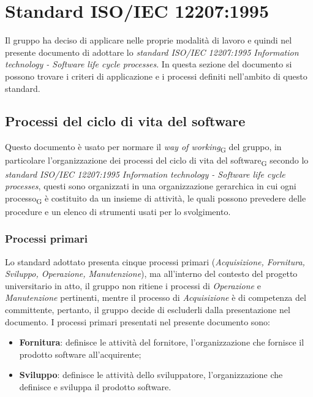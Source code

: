 \section{Standard ISO/IEC 12207:1995}
Il gruppo ha deciso di applicare nelle proprie modalità di lavoro e quindi nel presente documento di adottare lo \textit{standard ISO/IEC 12207:1995 Information technology - Software life cycle processes}. In questa sezione del documento si possono trovare i criteri di applicazione e i processi definiti nell'ambito di questo standard.
\subsection{Processi del ciclo di vita del software}
Questo documento è usato per normare il \textit{way of working}\textsubscript{G} del gruppo, in particolare l'organizzazione dei processi del ciclo di vita del software\textsubscript{G} secondo lo \textit{standard ISO/IEC 12207:1995 Information technology - Software life cycle processes}, questi sono organizzati in una organizzazione gerarchica in cui ogni processo\textsubscript{G} è costituito da un insieme di attività, le quali possono prevedere delle procedure e un elenco di strumenti usati per lo svolgimento.
\subsubsection{Processi primari}
Lo standard adottato presenta cinque processi primari (\textit{Acquisizione, Fornitura, Sviluppo, Operazione, Manutenzione}), ma all’interno del contesto del progetto universitario in atto, il gruppo non ritiene i processi di \textit{Operazione} e \textit{Manutenzione} pertinenti, mentre il processo di \textit{Acquisizione} è di competenza del committente, pertanto, il gruppo decide di escluderli dalla presentazione nel documento.
I processi primari presentati nel presente documento sono:
\begin{itemize}
    \item \textbf{Fornitura}: definisce le attività del fornitore, l’organizzazione che fornisce il prodotto software all’acquirente;
    \item \textbf{Sviluppo}: definisce le attività dello sviluppatore, l’organizzazione che definisce e sviluppa il prodotto software.
\end{itemize}

